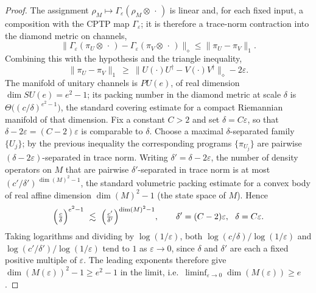 \documentclass[11pt]{article}
\begin{document}
\begin{proof}
The assignment $\rho_M\mapsto\Gamma_\varepsilon(\rho_M\otimes\,\cdot\,)$ is
linear and, for each fixed input, a composition with the CPTP map
$\Gamma_\varepsilon$; it is therefore a trace-norm contraction into the diamond
metric on channels,
\[
\bigl\|\Gamma_\varepsilon(\pi_U\otimes\,\cdot\,)
-\Gamma_\varepsilon(\pi_V\otimes\,\cdot\,)\bigr\|_\diamond
\le\|\pi_U-\pi_V\|_1 .
\]
Combining this with the hypothesis and the triangle inequality,
\[
\|\pi_U-\pi_V\|_1
\ \ge\
\|U(\cdot)U^\dagger-V(\cdot)V^\dagger\|_\diamond-2\varepsilon .
\]
The manifold of unitary channels is $PU(e)$, of real dimension
$\dim SU(e)=e^2-1$; its packing number in the diamond metric at scale $\delta$
is $\Theta\bigl((c/\delta)^{e^2-1}\bigr)$, the standard covering estimate for a
compact Riemannian manifold of that dimension. Fix a constant $C>2$ and set
$\delta=C\varepsilon$, so that $\delta-2\varepsilon=(C-2)\varepsilon$ is
comparable to $\delta$. Choose a maximal $\delta$-separated family $\{U_j\}$; by
the previous inequality the corresponding programs $\{\pi_{U_j}\}$ are pairwise
$(\delta-2\varepsilon)$-separated in trace norm. Writing
$\delta'=\delta-2\varepsilon$, the number of density operators on $M$ that are
pairwise $\delta'$-separated in trace norm is at most
$(c'/\delta')^{\,\dim(M)^2-1}$, the standard volumetric packing estimate for a
convex body of real affine dimension $\dim(M)^2-1$ (the state space of $M$).
Hence
\[
\Bigl(\tfrac c\delta\Bigr)^{e^2-1}
\ \lesssim\
\Bigl(\tfrac{c'}{\delta'}\Bigr)^{\dim(M)^2-1},
\qquad
\delta'=(C-2)\varepsilon,\ \ \delta=C\varepsilon .
\]
Taking logarithms and dividing by $\log(1/\varepsilon)$, both
$\log(c/\delta)/\log(1/\varepsilon)$ and
$\log(c'/\delta')/\log(1/\varepsilon)$ tend to $1$ as $\varepsilon\to0$, since
$\delta$ and $\delta'$ are each a fixed positive multiple of $\varepsilon$.
The leading exponents therefore give
$\dim(M(\varepsilon))^2-1\ge e^2-1$ in the limit, i.e.\
$\liminf_{\varepsilon\to0}\dim(M(\varepsilon))\ge e$.
\end{proof}
\end{document}
